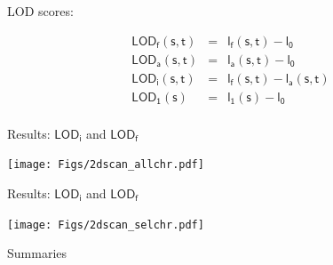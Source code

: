 \documentclass[12pt]{article}
\newcommand{\headsize}{\fontsize{35}{35} \selectfont}
\newcommand{\smallsize}{\fontsize{25}{30} \selectfont}
\newcommand{\lod}{\text{LOD}}
\begin{document}
\hfill \begin{minipage}[t]{10in}
LOD scores:

\vspace{5mm}

\hspace{1cm}
\begin{minipage}{5in}
{\color{myblue}
\begin{eqnarray*}
\mathsf{\lod_f(s,t)}& = &\mathsf{l_f(s,t) - l_0} \\[24pt]
\mathsf{\lod_a(s,t)}& = &\mathsf{l_a(s,t) - l_0} \\[24pt]
\mathsf{\lod_i(s,t)}& = &\mathsf{l_f(s,t) - l_a(s,t)} \\[24pt]
\mathsf{\lod_1(s)}&   = &\mathsf{l_1(s) - l_0} \\[24pt]
\end{eqnarray*}
}
\end{minipage}



\end{minipage}


\newpage

\headsize \color{myyellow}
\hfill \begin{minipage}{5.75in}
\centering
Results: $\mathsf{\lod_i}$ and $\mathsf{\lod_f}$
\end{minipage}

\vfill 

\centerline{\texttt{[image: Figs/2dscan\_allchr.pdf]}}

\newpage

\headsize \color{myyellow}
\hfill \begin{minipage}{5.75in}
\centering
Results: $\mathsf{\lod_i}$ and $\mathsf{\lod_f}$
\end{minipage}

\vfill 

\centerline{\texttt{[image: Figs/2dscan\_selchr.pdf]}}

\newpage

\headsize \color{myyellow}
\hfill \begin{minipage}{5.75in}
\centering
Summaries
\end{minipage}

\vspace{15mm}

\color{mywhite} \smallsize
\end{document}
